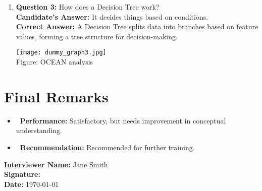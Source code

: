 \documentclass[a4paper,12pt]{article}
\newcommand{\sectionline}{\noindent\rule{\linewidth}{1pt}}
\begin{document}
\begin{enumerate}
    \item 
    \begin{minipage}{0.7\textwidth}
        \textbf{Question 3:} How does a Decision Tree work? \\
        \textbf{Candidate's Answer:} It decides things based on conditions. \\
        \textbf{Correct Answer:} A Decision Tree splits data into branches based on feature values, forming a tree structure for decision-making.
    \end{minipage}
    \hfill
    \begin{minipage}{0.28\textwidth}
        \begin{flushright}
            \texttt{[image: dummy\_graph3.jpg]} \\
            \small Figure: OCEAN analysis
        \end{flushright}
    \end{minipage}

\end{enumerate}



\newpage
\section*{Final Remarks}
\begin{itemize}
    \item \textbf{\faUser\ Performance:} Satisfactory, but needs improvement in conceptual understanding.
    \item \textbf{\faGraduationCap\ Recommendation:} Recommended for further training.
\end{itemize}

\vspace{2em}
\noindent\textbf{Interviewer Name:} Jane Smith \\
\textbf{Signature:} \makebox[3cm]{\hrulefill} \\
\textbf{Date:} \today
\end{document}
